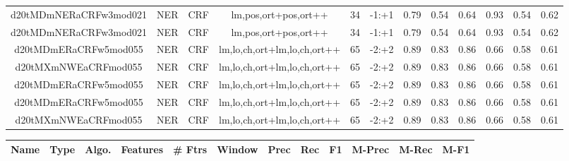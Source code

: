 \documentclass[a4paper]{article}
\begin{document}
\begin{landscape}
\begin{center}
\begin{tabular}{ |c|c|c|c|c|c|c|c|c|c|c|c|}
 	
 
 	
 		
 		\small{ d20tMDmNERaCRFw3mod021 } & NER & CRF & lm,pos,ort+pos,ort++  &  34 &  -1:+1  &  0.79 & 0.54 & 0.64  &  0.93 & 0.54 & 0.62 \\
 		

 	
 
 	
 		
 		\small{ d20tMDmNERaCRFw3mod021 } & NER & CRF & lm,pos,ort+pos,ort++  &  34 &  -1:+1  &  0.79 & 0.54 & 0.64  &  0.93 & 0.54 & 0.62 \\
 		

 	
 
 	
 		
 		\small{ d20tMDmERaCRFw5mod055 } & NER & CRF & lm,lo,ch,ort+lm,lo,ch,ort++  &  65 &  -2:+2  &  0.89 & 0.83 & 0.86  &  0.66 & 0.58 & 0.61 \\
 		

 	
 
 	
 		
 		\small{ d20tMXmNWEaCRFmod055 } & NER & CRF & lm,lo,ch,ort+lm,lo,ch,ort++  &  65 &  -2:+2  &  0.89 & 0.83 & 0.86  &  0.66 & 0.58 & 0.61 \\
 		

 	
 
 	
 		
 		\small{ d20tMDmERaCRFw5mod055 } & NER & CRF & lm,lo,ch,ort+lm,lo,ch,ort++  &  65 &  -2:+2  &  0.89 & 0.83 & 0.86  &  0.66 & 0.58 & 0.61 \\
 		

 	
 
 	
 		
 		\small{ d20tMDmERaCRFw5mod055 } & NER & CRF & lm,lo,ch,ort+lm,lo,ch,ort++  &  65 &  -2:+2  &  0.89 & 0.83 & 0.86  &  0.66 & 0.58 & 0.61 \\
 		

 	
 
 	
 		
 		\small{ d20tMXmNWEaCRFmod055 } & NER & CRF & lm,lo,ch,ort+lm,lo,ch,ort++  &  65 &  -2:+2  &  0.89 & 0.83 & 0.86  &  0.66 & 0.58 & 0.61 \\
 		
 \hline
\end{tabular}
\end{center}




\begin{center}
\begin{tabular}{ |c|c|c|c|c|c|c|c|c|c|c|c|} 
 \hline
 	Name & Type & Algo. & Features & \# Ftrs & Window & Prec & Rec & F1 & M-Prec & M-Rec & M-F1\\
 \hline


\end{tabular}
\end{center}
\end{landscape}
\end{document}
